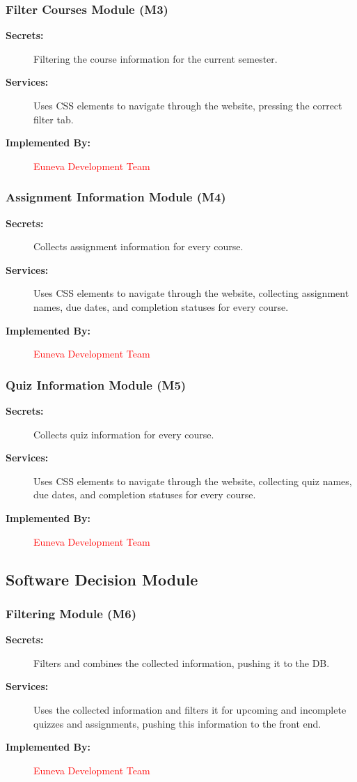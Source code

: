 \documentclass[12pt, titlepage]{article}
\begin{document}
\subsubsection{Filter Courses Module (M3)}
\begin{description}
    \item[\textbf{Secrets:}] Filtering the course information for the current semester.
    \item[\textbf{Services:}] Uses CSS elements to navigate through the website, pressing the correct filter tab.
    \item[\textbf{Implemented By:}] \textcolor{red}{Euneva Development Team}
\end{description}

\subsubsection{Assignment Information Module (M4)}
\begin{description}
    \item[\textbf{Secrets:}] Collects assignment information for every course.
    \item[\textbf{Services:}] Uses CSS elements to navigate through the website, collecting assignment names, due dates, and completion statuses for every course.
    \item[\textbf{Implemented By:}] \textcolor{red}{Euneva Development Team}
\end{description}

\subsubsection{Quiz Information Module (M5)}
\begin{description}
    \item[\textbf{Secrets:}] Collects quiz information for every course.
    \item[\textbf{Services:}] Uses CSS elements to navigate through the website, collecting quiz names, due dates, and completion statuses for every course.
    \item[\textbf{Implemented By:}] \textcolor{red}{Euneva Development Team}
\end{description}

\subsection{Software Decision Module}
\subsubsection{Filtering Module (M6)}
\begin{description}
    \item[\textbf{Secrets:}] Filters and combines the collected information, pushing it to the DB.
    \item[\textbf{Services:}] Uses the collected information and filters it for upcoming and incomplete quizzes and assignments, pushing this information to the front end.
    \item[\textbf{Implemented By:}] \textcolor{red}{Euneva Development Team}
\end{description}
\end{document}
